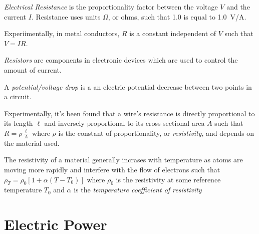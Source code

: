 \begin{definition}
    \emph{Electrical Resistance} is the proportionality factor between the voltage $V$ and the current $I$. Resistance uses units $\Omega$, or ohms, such that \qty{1.0}{\Omega} is equal to \qty{1.0}{V/A}.
\end{definition}
\begin{definition}
    Experiimentally, in metal conductors, $R$ is a constant independent of $V$ such that $V = IR$.
\end{definition}
\begin{definition}[Resistors]
    \emph{Resistors} are components in electronic devices which are used to control the amount of current.
\end{definition}
\begin{definition}
    A \emph{potential/voltage drop} is a an electric potential decrease between two points in a circuit.
\end{definition}
\begin{definition}[Resistivity]
    Experimentally, it's been found that a wire's resistance is directly proportional to its length $\ell$ and inversely proportional to its cross-sectional area $A$ such that $R = \rho\frac{\ell}{A}$ where $\rho$ is the constant of proportionality, or \emph{resistivity}, and depends on the material used. 
\end{definition}
\begin{remark}
    The resistivity of a material generally incrases with temperature as atoms are moving more rapidly and interfere with the flow of electrons such that $\rho_T = \rho_0[1 + \alpha(T - T_0)]$ where $\rho_0$ is the resistivity at some reference temperature $T_0$ and $\alpha$ is the \emph{temperature coefficient of resistivity}
\end{remark}

\section{Electric Power}

